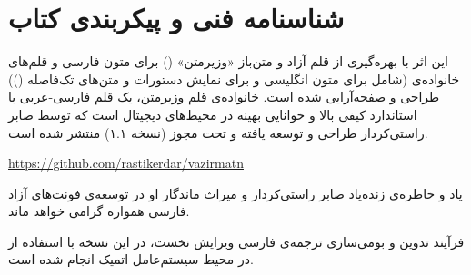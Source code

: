 \chapter*{شناسنامه فنی و پیکربندی کتاب}

این اثر با بهره‌گیری از قلم آزاد و متن‌باز «وزیرمتن» () برای متون فارسی و قلم‌های خانواده‌ی  (شامل  برای متون انگلیسی و  برای نمایش دستورات و متن‌های تک‌فاصله ()) طراحی و صفحه‌آرایی شده است. خانواده‌ی قلم وزیرمتن، یک قلم فارسی-عربی با استاندارد کیفی بالا و خوانایی بهینه در محیط‌های دیجیتال است که توسط صابر راستی‌کردار طراحی و توسعه یافته و تحت مجوز  (نسخه ۱.۱) منتشر شده است.

\begin{latin}
\url{https://github.com/rastikerdar/vazirmatn}
\end{latin}

یاد و خاطره‌ی زنده‌یاد صابر راستی‌کردار و میراث ماندگار او در توسعه‌ی فونت‌های آزاد فارسی همواره گرامی خواهد ماند.

فرآیند تدوین و بومی‌سازی ترجمه‌ی فارسی ویرایش نخست، در این نسخه با استفاده از  در محیط سیستم‌عامل اتمیک  انجام شده است.